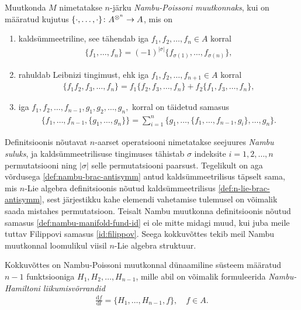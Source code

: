 \begin{dfn}
    Muutkonda $M$ nimetatakse $n$-järku \emph{Nambu-Poissoni muutkonnaks},
    kui on määratud kujutus
    $\{\cdot, \dots, \cdot\} \colon A^{\otimes^n} \to A$, mis on
    \begin{enumerate}
        \item kaldsümmeetriline, see tähendab iga $f_1, f_2, \dots, f_n \in A$
            korral
            \begin{align}\label{def:nambu-brac-antisymm}
                \{f_1, \dots, f_n\} = (-1)^{|\sigma|}
                \{f_{\sigma(1)}, \dots, f_{\sigma(n)}\},
            \end{align}
        \item rahuldab Leibnizi tingimust, ehk iga
            $f_1, f_2, \dots, f_{n+1} \in A$ korral
            \begin{align}
                \{f_1 f_2, f_3, \dots, f_n\} =
                f_1 \{f_2, f_3, \dots, f_n\} +
                f_2 \{f_1, f_3, \dots, f_n\},
            \end{align}
        \item iga $f_1, f_2, \dots, f_{n-1}, g_1, g_2, \dots, g_n,$ korral on
        täidetud samasus
            \begin{align}\label{def:nambu-manifold-fund-id}
                \{f_1, \dots, f_{n-1}, \{g_1, \dots, g_n\}\} =
                \sum_{i=1}^{n} \{
                    g_1, \dots, \{f_1, \dots, f_{n-1}, g_i\}, \dots, g_n
                \}.
            \end{align}
    \end{enumerate}
\end{dfn}

Definitsioonis nõutavat $n$-aarset operatsiooni nimetatakse seejuures
\emph{Nambu suluks}, ja kaldsümmeetrilisuse tingimuses tähistab
$\sigma$ indeksite $i = 1, 2, \dots, n$ permutatsiooni ning
$|\sigma|$ selle permutatsiooni paarsust. Tegelikult on
aga võrdusega \eqref{def:nambu-brac-antisymm} antud kaldsümmeetrilisus
täpselt sama, mis $n$-Lie algebra definitsioonis nõutud kaldsümmeetrilisus
\eqref{def:n-lie-brac-antisymm}, sest järjestikku kahe elemendi vahetamise
tulemusel on võimalik saada mistahes permutatsioon. Teisalt Nambu
muutkonna definitsioonis nõutud samasus \eqref{def:nambu-manifold-fund-id}
ei ole mitte midagi muud, kui juba meile tuttav Filippovi samasus
\eqref{id:filippov}. Seega kokkuvõttes tekib meil Nambu muutkonnal
loomulikul viisil $n$-Lie algebra struktuur.

Kokkuvõttes on Nambu-Poissoni muutkonnal dünaamiline süsteem määratud
$n-1$ funktsiooniga $H_1, H_2, \dots, H_{n-1}$, mille abil on võimalik
formuleerida \emph{Nambu-Hamiltoni liikumisvõrrandid}
\begin{align*}
    \frac{\mathrm{d} f}{\mathrm{d} t} = \{H_1, \dots, H_{n-1}, f\},
    \quad f \in A.
\end{align*}

